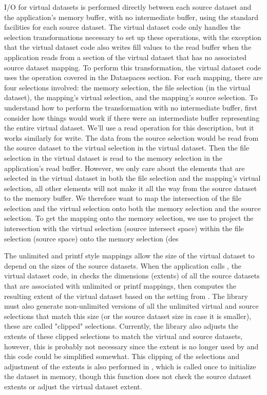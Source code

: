 \begin{itemize}
I/O for virtual datasets is performed directly between each source dataset and the application's memory buffer, with no intermediate buffer, using the standard facilities for each source dataset. The virtual dataset code only handles the selection transformations necessary to set up these operations, with the exception that the virtual dataset code also writes fill values to the read buffer when the application reads from a section of the virtual dataset that has no associated source dataset mapping. To perform this transformation, the virtual dataset code uses the  operation covered in the Dataspaces section. For each mapping, there are four selections involved: the memory selection, the file selection (in the virtual dataset), the mapping's virtual selection, and the mapping's source selection. To understand how to perform the transformation with no intermediate buffer, first consider how things would work if there were an intermediate buffer representing the entire virtual dataset. We'll use a read operation for this description, but it works similarly for write. The data from the source selection would be read from the source dataset to the virtual selection in the virtual dataset. Then the file selection in the virtual dataset is read to the memory selection in the application's read buffer. However, we only care about the elements that are selected in the virtual dataset in both the file selection and the mapping's virtual selection, all other elements will not make it all the way from the source dataset to the memory buffer. We therefore want to map the intersection of the file selection and the virtual selection onto both the memory selection and the source selection. To get the mapping onto the memory selection, we use  to project the intersection with the virtual selection (source intersect space) within the file selection (source space) onto the memory selection (des

The unlimited and printf style mappings allow the size of the virtual dataset to depend on the sizes of the source datasets. When the application calls , the virtual dataset code, in  checks the dimensions (extents) of all the source datasets that are associated with unlimited or printf mappings, then computes the resulting extent of the virtual dataset based on the setting from . The library must also generate non-unlimited versions of all the unlimited virtual and source selections that match this size (or the source dataset size in case it is smaller), these are called "clipped" selections. Currently, the library also adjusts the extents of these clipped selections to match the virtual and source datasets, however, this is probably not necessary since the extent is no longer used by  and this code could be simplified somewhat. This clipping of the selections and adjustment of the extents is also performed in , which is called once to initialize the dataset in memory, though this function does not check the source dataset extents or adjust the virtual dataset extent.


\end{itemize}
